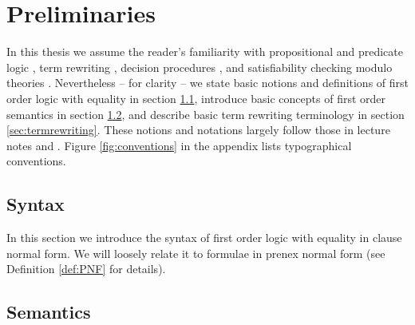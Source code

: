 
\chapter{Preliminaries}



In this thesis we assume the reader's familiarity with 
propositional and predicate logic \cite{Huth:2004:LCS:975331}, 
term rewriting \cite{Baader:1998:TR:280474}, 
decision procedures \cite{Kroening:2008:DPA:1391237}, 
and satisfiability checking modulo theories \cite{Biere:2009:HSV:1550723}.
Nevertheless -- for clarity -- we state basic notions and  definitions 
of first order logic with equality in section \ref{sec:syntax},
introduce basic concepts of first order semantics in section \ref{sec:semantics},
and describe basic term rewriting terminology in section \ref{sec:termrewriting}. 
These notions and notations largely follow those in lecture notes \cite{AM2015tr} and \cite{GM2013ar}.
Figure \vref{fig:conventions} in the appendix lists typographical conventions.


\section{Syntax}\label{sec:syntax}

In this section we introduce the syntax of first order logic with equality in clause normal form.
We will loosely relate it to formulae in prenex normal form (see Definition \ref{def:PNF} for details).

















\section{Semantics}\label{sec:semantics}

